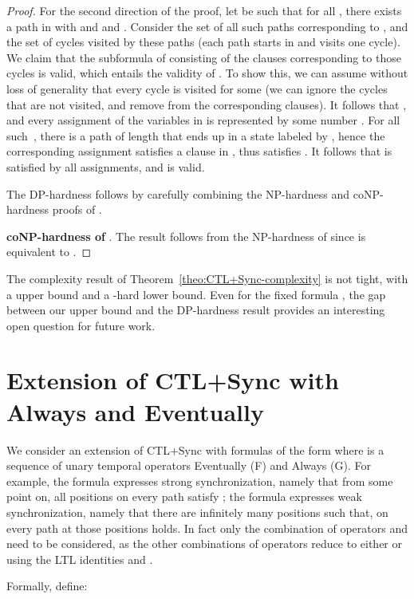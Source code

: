 \documentclass{article}
\begin{document}
\begin{proof}
For the second direction of the proof, let  be such that for all , 
there exists a path  in  with  and 
 and . Consider the set of all such paths
corresponding to , and the set of cycles visited by these
paths (each path starts in  and visits one cycle). We claim that 
the subformula of  consisting of the clauses corresponding to those cycles
is valid, which entails the validity of . To show this, we can assume
without loss of generality that every cycle is visited for some  (we can ignore
the cycles that are not visited, and remove from  the corresponding clauses).
It follows that , and every assignment of the 
variables in  is represented by some number . For all such~,
there is a path of length  that ends up in a state labeled by , hence
the corresponding assignment satisfies a clause in , thus satisfies .
It follows that  is satisfied by all assignments, and  is valid. 

The DP-hardness follows by carefully  combining the NP-hardness and coNP-hardness proofs
of . 

{\bf coNP-hardness of }. The result follows from
the NP-hardness of  since  is equivalent to .
\end{proof}





The complexity result of Theorem~\ref{theo:CTL+Sync-complexity} is not tight, with a  upper bound and a -hard lower bound.
Even for the fixed formula , the gap between our 
upper bound and the DP-hardness result provides an interesting open question for future work. 

\section{Extension of CTL+Sync with Always and Eventually} \label{sec:extension}

We consider an extension of CTL+Sync with formulas of the form 
where  is a sequence of unary temporal operators Eventually (F) and Always (G).
For example, the formula  expresses strong synchronization, 
namely that from some point on, all positions on every path satisfy ;
the formula  expresses weak synchronization, namely that
there are infinitely many positions such that, on every path at those positions
 holds. In fact only the combination of operators  and  need to be 
considered, as the other combinations of operators reduce to either 
 or  using the LTL identities  
and . 

Formally, define:
\end{document}
